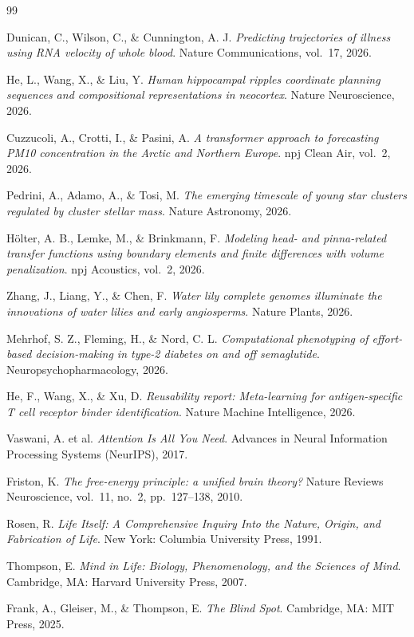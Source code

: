 \documentclass[12pt,a4paper]{article}
\begin{document}
\begin{thebibliography}{99}

Dunican, C., Wilson, C., \& Cunnington, A. J.
\textit{Predicting trajectories of illness using RNA velocity of whole blood}.
Nature Communications, vol.~17, 2026.

He, L., Wang, X., \& Liu, Y.
\textit{Human hippocampal ripples coordinate planning sequences and compositional
representations in neocortex}.
Nature Neuroscience, 2026.

Cuzzucoli, A., Crotti, I., \& Pasini, A.
\textit{A transformer approach to forecasting PM10 concentration in the Arctic
and Northern Europe}.
npj Clean Air, vol.~2, 2026.

Pedrini, A., Adamo, A., \& Tosi, M.
\textit{The emerging timescale of young star clusters regulated by cluster stellar
mass}.
Nature Astronomy, 2026.

H\"{o}lter, A. B., Lemke, M., \& Brinkmann, F.
\textit{Modeling head- and pinna-related transfer functions using boundary elements
and finite differences with volume penalization}.
npj Acoustics, vol.~2, 2026.

Zhang, J., Liang, Y., \& Chen, F.
\textit{Water lily complete genomes illuminate the innovations of water lilies and
early angiosperms}.
Nature Plants, 2026.

Mehrhof, S. Z., Fleming, H., \& Nord, C. L.
\textit{Computational phenotyping of effort-based decision-making in type-2 diabetes
on and off semaglutide}.
Neuropsychopharmacology, 2026.

He, F., Wang, X., \& Xu, D.
\textit{Reusability report: Meta-learning for antigen-specific T cell receptor binder
identification}.
Nature Machine Intelligence, 2026.

Vaswani, A. et al.
\textit{Attention Is All You Need}.
Advances in Neural Information Processing Systems (NeurIPS), 2017.

Friston, K.
\textit{The free-energy principle: a unified brain theory?}
Nature Reviews Neuroscience, vol.~11, no.~2, pp.~127--138, 2010.

Rosen, R.
\textit{Life Itself: A Comprehensive Inquiry Into the Nature, Origin, and Fabrication
of Life}.
New York: Columbia University Press, 1991.

Thompson, E.
\textit{Mind in Life: Biology, Phenomenology, and the Sciences of Mind}.
Cambridge, MA: Harvard University Press, 2007.

Frank, A., Gleiser, M., \& Thompson, E.
\textit{The Blind Spot}.
Cambridge, MA: MIT Press, 2025.

\end{thebibliography}
\end{document}
